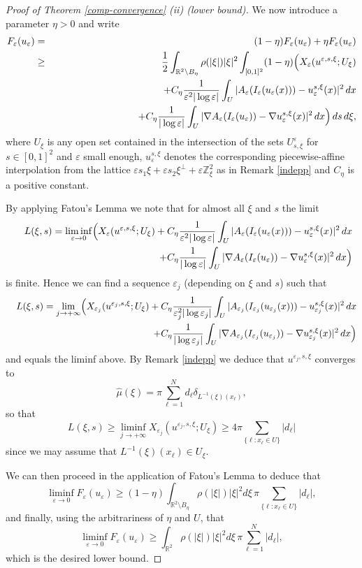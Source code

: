 \documentclass[10pt,a4paper]{amsart}
\def\e{\varepsilon}
\begin{document}
\begin{proof}[Proof of Theorem {\rm\ref{comp-convergence}} {\rm (ii)} (lower bound)]
We now introduce a parameter $\eta>0$ and write
\begin{eqnarray*}
F_\e(u_\e)& =&
(1-\eta)F_\e(u_\e) +\eta F_\e(u_\e)\\
&\ge& \frac{1}{2}\int_{\mathbb R^2\setminus B_\eta}\rho(|\xi|)|\xi|^2 
\int_{[0,1]^2}(1-\eta)\Bigl(X_\e (u^{\e,s,\xi};U_\xi) \\
&&\hskip3cm +C_\eta\frac{1}{\e^2|\log\e|}\int_U| A_\e(I_\e(u_\e (x))) - u^{s,\xi}_\e(x)|^2\, dx\nonumber\\
 &&\hskip3cm +C_\eta
 \frac{1}{|\log\e|}\int_U| \nabla A_\e(I_\e(u_\e)) - \nabla u^{s,\xi}_\e(x)|^2\, dx\Big)\, ds\,d\xi,
\end{eqnarray*}
where $U_\xi$ is any open set contained in the intersection of the sets $U^\e_{s,\xi}$ for $s\in[0,1]^2$ and $\e$ small enough, $u^{s,\xi}_\e$ denotes the corresponding piecewise-affine interpolation from the lattice $\e s_1\xi+\e s_2\xi^\perp+\e \mathbb Z^2_\xi$ as in Remark \ref{indepp} and $C_\eta$ is a positive constant.

By applying Fatou's Lemma we note that for almost all $\xi$ and $s$ the limit 
\begin{eqnarray*}
&&L(\xi,s)=\liminf_{\e\to 0} \Bigl(X_\e (u^{\e,s,\xi};U_\xi) +C_\eta\frac{1}{\e^2|\log\e|}\int_U| A_\e(I_\e(u_\e (x))) - u^{s,\xi}_\e(x)|^2\, dx\nonumber\\
 &&\hskip5cm +C_\eta
 \frac{1}{|\log\e|}\int_U| \nabla A_\e(I_\e(u_\e)) - \nabla u^{s,\xi}_\e(x)|^2\, dx\Big)
\end{eqnarray*}
is finite. Hence we can find a sequence $\e_j$ (depending on $\xi$ and $s$) such that 
\begin{eqnarray*}
&&L(\xi,s)=\lim_{j\to+\infty} \Bigl(X_{\e_j} (u^{\e_j,s,\xi};U_\xi)+C_\eta\frac{1}{\e_j^2|\log\e_j|}\int_U| A_{\e_j}(I_{\e_j}(u_{\e_j} (x))) - u^{s,\xi}_{\e_j}(x)|^2\, dx\\&&\hskip5cm +C_\eta
 \frac{1}{|\log{\e_j}|}\int_U| \nabla A_{\e_j}(I_{\e_j}(u_{\e_j})) - \nabla u^{s,\xi}_{\e_j}(x)|^2\, dx\Big)
\end{eqnarray*}
and equals the liminf above.  
By Remark \ref{indepp} we deduce that $u^{\e_j,s,\xi}$ converges to 
$$\hat\mu(\xi)=\pi\sum_{\ell=1}^Nd_\ell\delta_{L^{-1}(\xi)(x_\ell)},$$ 
so that
$$L(\xi,s)\ge \liminf_{j\to+\infty}X_{\e_j} (u^{\e_j,s,\xi};U_\xi)\ge 4\pi\sum_{\{\ell: x_\ell\in U\}} |d_\ell|$$ 
since we may assume that $L^{-1}(\xi)(x_\ell)\in U_\xi$. 

We can then proceed in the application of Fatou's Lemma to deduce that
$$\liminf_{\e\to0}F_\e(u_\e)\ge (1-\eta)\int_{\mathbb R^2\setminus B_\eta}\rho(|\xi|)|\xi|^2d\xi\,  \pi\sum_{\{\ell: x_\ell\in U\}}|d_\ell|,
$$
and finally, using the arbitrariness of $\eta$ and $U$, that
$$\liminf_{\e\to0}F_\e(u_\e)\ge \int_{\mathbb R^2}\rho(|\xi|)|\xi|^2d\xi\,  \pi\sum_{\ell=1}^N|d_\ell|,$$
which is the desired lower bound.


\end{proof}
\end{document}
